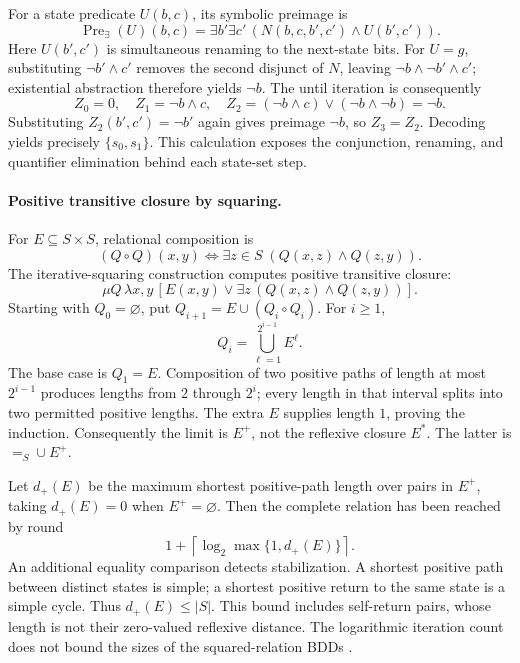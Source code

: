 For a state predicate \(U(b,c)\), its symbolic preimage is
\[
 \operatorname{Pre}_{\exists}(U)(b,c)
 =\exists b'\exists c'\,
      (N(b,c,b',c')\land U(b',c')).
\]
Here \(U(b',c')\) is simultaneous renaming to the next-state bits.
For \(U=g\), substituting \(\neg b'\land c'\) removes the second disjunct
of \(N\), leaving \(\neg b\land\neg b'\land c'\); existential abstraction
therefore yields \(\neg b\).
The until iteration is consequently
\[
 Z_0=0,\quad Z_1=\neg b\land c,\quad
 Z_2=(\neg b\land c)\lor(\neg b\land\neg b)=\neg b.
\]
Substituting \(Z_2(b',c')=\neg b'\) again gives preimage \(\neg b\), so
\(Z_3=Z_2\). Decoding yields precisely \(\{s_0,s_1\}\).
This calculation exposes the conjunction, renaming, and quantifier
elimination behind each state-set step.

\paragraph{Positive transitive closure by squaring.}
For \(E\subseteq S\times S\), relational composition is
\[
 (Q\circ Q)(x,y)\iff
       \exists z\in S\;(Q(x,z)\land Q(z,y)).
\]
The iterative-squaring construction computes positive transitive closure:
\[
 \mu Q\,\lambda x,y\,[E(x,y)\lor
   \exists z\,(Q(x,z)\land Q(z,y))].
\]
Starting with \(Q_0=\varnothing\), put \(Q_{i+1}=E\cup(Q_i\circ Q_i)\).
For \(i\geq1\),
\[
 Q_i=\bigcup_{\ell=1}^{2^{i-1}}E^\ell.
\]
The base case is \(Q_1=E\). Composition of two positive paths of
length at most \(2^{i-1}\) produces lengths from \(2\) through \(2^i\);
every length in that interval splits into two permitted positive
lengths. The extra \(E\) supplies length \(1\), proving the induction.
Consequently the limit is \(E^+\), not the reflexive closure \(E^*\).
The latter is \(=_{S}\cup E^+\).

Let \(d_+(E)\) be the maximum shortest positive-path length over pairs
in \(E^+\), taking \(d_+(E)=0\) when \(E^+=\varnothing\). Then the
complete relation has been reached by round
\[
 1+\left\lceil\log_2\max\{1,d_+(E)\}\right\rceil.
\]
An additional equality comparison detects stabilization. A shortest
positive path between distinct states is simple; a shortest positive
return to the same state is a simple cycle. Thus \(d_+(E)\leq|S|\).
This bound includes self-return pairs, whose length is not their
zero-valued reflexive distance. The logarithmic iteration count does
not bound the sizes of the squared-relation BDDs
\cite[\S5]{BurchEtAl1992}.

